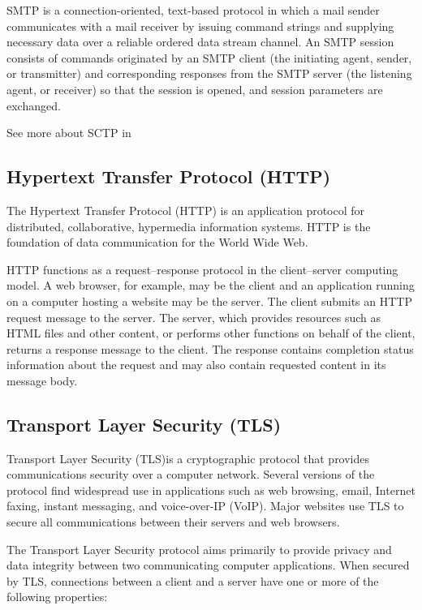 SMTP is a connection-oriented, text-based protocol in which a mail sender communicates with a mail receiver by issuing command strings and supplying necessary data over a reliable ordered data stream channel. An SMTP session consists of commands originated by an SMTP client (the initiating agent, sender, or transmitter) and corresponding responses from the SMTP server (the listening agent, or receiver) so that the session is opened, and session parameters are exchanged.

See more about SCTP in \cite{SMTP}

\subsection{Hypertext Transfer Protocol (HTTP)} 
The Hypertext Transfer Protocol (HTTP) is an application protocol for distributed, collaborative, hypermedia information systems. HTTP is the foundation of data communication for the World Wide Web.

HTTP functions as a request–response protocol in the client–server computing model. A web browser, for example, may be the client and an application running on a computer hosting a website may be the server. The client submits an HTTP request message to the server. The server, which provides resources such as HTML files and other content, or performs other functions on behalf of the client, returns a response message to the client. The response contains completion status information about the request and may also contain requested content in its message body.

\subsection{Transport Layer Security (TLS)} 
Transport Layer Security (TLS)is a cryptographic protocol that provides communications security over a computer network. Several versions of the protocol find widespread use in applications such as web browsing, email, Internet faxing, instant messaging, and voice-over-IP (VoIP). Major websites use TLS to secure all communications between their servers and web browsers.

The Transport Layer Security protocol aims primarily to provide privacy and data integrity between two communicating computer applications. When secured by TLS, connections between a client  and a server have one or more of the following properties:

